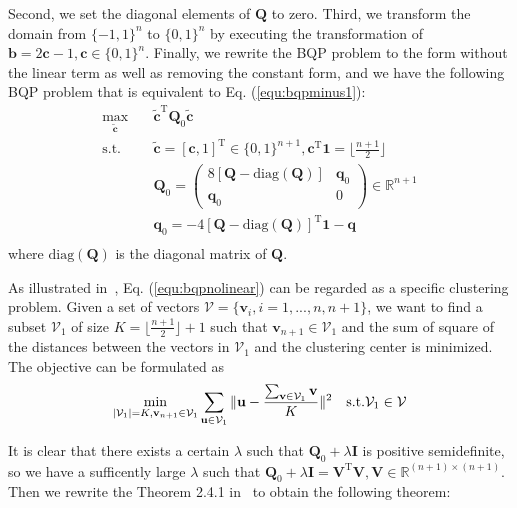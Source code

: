 \documentclass[conference]{IEEEtran}
\begin{document}
Second, we set the diagonal elements of $\mathbf{Q}$ to zero. Third, we transform the domain from $\{-1,1\}^n$ to $\{0,1\}^n$ by executing the transformation of $\mathbf{b}=2\mathbf{c}-1,\mathbf{c} \in \{0,1\}^n$. Finally, we rewrite the BQP problem to the form without the linear term as well as removing the constant form, and we have the following BQP problem that is equivalent to Eq. (\ref{equ:bqpminus1}):
\begin{equation}
\begin{split}
\max_{\tilde{\mathbf{c}}} \quad& \tilde{\mathbf{c}}^\mathrm{T} \mathbf{Q}_0 \tilde{\mathbf{c}} \\
\mathrm{s.t.} \quad& \tilde{\mathbf{c}} = [\mathbf{c},1]^\mathrm{T} \in \{0,1\}^{n+1}, \mathbf{c}^\mathrm{T} \mathbf{1} = \lfloor \frac{n+1}{2} \rfloor \\
&\mathbf{Q}_0 = \begin{pmatrix} 8[\mathbf{Q}-\mathrm{diag}(\mathbf{Q})] & \mathbf{q}_0 \\ \mathbf{q}_0 & 0 \end{pmatrix} \in \mathbb{R}^{n+1} \\
&\mathbf{q}_0 = -4[\mathbf{Q}-\mathrm{diag}(\mathbf{Q})]^\mathrm{T}\mathbf{1} - \mathbf{q} \\
\end{split}
\label{equ:bqpnolinear}
\end{equation}
where $\mathrm{diag}(\mathbf{Q})$ is the diagonal matrix of $\mathbf{Q}$.

As illustrated in~\cite{yang2013new}, Eq. (\ref{equ:bqpnolinear}) can be regarded as a specific clustering problem. Given a set of vectors $\mathcal{V} = \{\mathbf{v}_i, i=1,...,n,n+1\}$, we want to find a subset $\mathcal{V}_1$ of size $K=\lfloor \frac{n+1}{2} \rfloor+1$ such that $\mathbf{v}_{n+1} \in \mathcal{V}_1$ and the sum of square of the distances between the vectors in $\mathcal{V}_1$ and the clustering center is minimized. The objective can be formulated as
\begin{equation}
\min_{|\mathcal{V}_1|=K, \mathbf{v}_{n+1} \in \mathcal{V}_1} \sum_{\mathbf{u} \in \mathcal{V}_1} \Arrowvert \mathbf{u} - \frac{\sum_{\mathbf{v} \in \mathcal{V}_1} \mathbf{v}}{K} \Arrowvert^2 \quad \mathrm{s.t.} \mathcal{V}_1 \in \mathcal{V}
\label{equ:cluster}
\end{equation}

It is clear that there exists a certain $\lambda$ such that $\mathbf{Q}_0+\lambda\mathbf{I}$ is positive semidefinite, so we have a sufficently large $\lambda$ such that $\mathbf{Q}_0+\lambda\mathbf{I}=\mathbf{V}^\mathrm{T}\mathbf{V},\mathbf{V} \in \mathbb{R}^{(n+1) \times (n+1)}$. Then we rewrite the Theorem 2.4.1 in~\cite{yang2013new} to obtain the following theorem:
\end{document}
